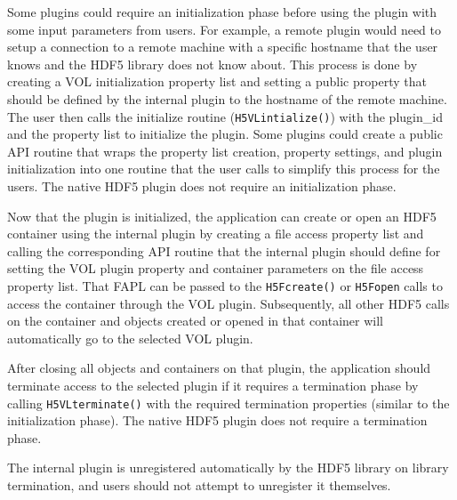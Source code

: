 Some plugins could require an initialization phase before using the plugin with some input parameters from users. For example, a remote plugin would need to setup a connection to a remote machine with a specific hostname that the user knows and the HDF5 library does not know about. This process is done by creating a VOL initialization property list and setting a public property that should be defined by the internal plugin to the hostname of the remote machine. The user then calls the initialize routine ({\tt H5VLintialize()}) with the plugin\_id and the property list to initialize the plugin. Some plugins could create a public API routine that wraps the property list creation, property settings, and plugin initialization into one routine that the user calls to simplify this process for the users. The native HDF5 plugin does not require an initialization phase.

Now that the plugin is initialized, the application can create or open an HDF5 container using the internal plugin by creating a file access property list and calling the corresponding API routine that the internal plugin should define for setting the VOL plugin property and container parameters on the file access property list. That FAPL can be passed to the {\tt H5Fcreate()} or {\tt H5Fopen{}} calls to access the container through the VOL plugin. Subsequently, all other HDF5 calls on the container and objects created or opened in that container will automatically go to the selected VOL plugin. 

After closing all objects and containers on that plugin, the application should terminate access to the selected plugin if it requires a termination phase by calling {\tt H5VLterminate()} with the required termination properties (similar to the initialization phase). The native HDF5 plugin does not require a termination phase.

The internal plugin is unregistered automatically by the HDF5 library on library termination, and users should not attempt to unregister it themselves.

